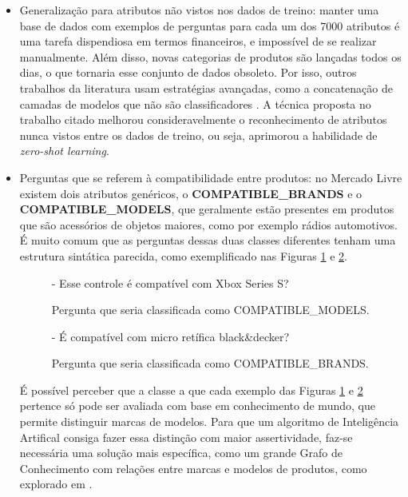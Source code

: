 \begin{itemize}
    \item Generalização para atributos não vistos nos dados de treino: manter uma base de dados com exemplos de perguntas para cada um dos 7000 atributos é uma tarefa dispendiosa em termos financeiros, e impossível de se realizar manualmente. Além disso, novas categorias de produtos são lançadas todos os dias, o que tornaria esse conjunto de dados obsoleto. Por isso, outros trabalhos da literatura usam estratégias avançadas, como a concatenação de camadas de modelos que não são classificadores \cite{aliexpress}. A técnica proposta no trabalho citado melhorou consideravelmente o reconhecimento de atributos nunca vistos entre os dados de treino, ou seja, aprimorou a habilidade de \textit{zero-shot learning}.
    
    \item Perguntas que se referem à compatibilidade entre produtos: no Mercado Livre existem dois atributos genéricos, o \textbf{COMPATIBLE\_BRANDS} e o \textbf{COMPATIBLE\_MODELS}, que geralmente estão presentes em produtos que são acessórios de objetos maiores, como por exemplo rádios automotivos. É muito comum que as perguntas dessas duas classes diferentes tenham uma estrutura sintática parecida, como exemplificado nas Figuras \ref{fig:ex_model} e \ref{fig:ex_brand}.
    
    \begin{figure}[htb]
        \centering
        \color{blue}- Esse controle é compatível com Xbox Series S?
        \caption{Pergunta que seria classificada como COMPATIBLE\_MODELS.}
        \label{fig:ex_model}
    \end{figure}
    
    \begin{figure}[htb]
        \centering
        \color{blue}- É compatível com micro retífica black\&decker?
        \caption{Pergunta que seria classificada como COMPATIBLE\_BRANDS.}
        \label{fig:ex_brand}
    \end{figure}

    É possível perceber que a classe a que cada exemplo das Figuras \ref{fig:ex_model} e \ref{fig:ex_brand} pertence só pode ser avaliada com base em conhecimento de mundo, que permite distinguir marcas de modelos. Para que um algoritmo de Inteligência Artifical consiga fazer essa distinção com maior assertividade, faz-se necessária uma solução mais específica, como um grande Grafo de Conhecimento com relações entre marcas e modelos de produtos, como explorado em \cite{kg}.
    

\end{itemize}

